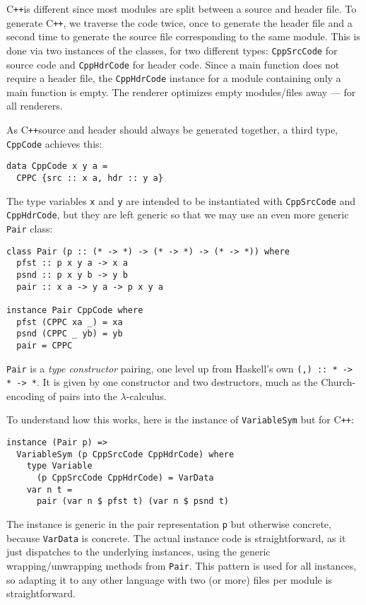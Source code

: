 \documentclass[sigplan,review,anonymous,prologue,dvipsnames]{acmart}
\newcommand{\Cplusplus}{C\texttt{++}}
\begin{document}
\Cplusplus is different since most modules are split between a source and
header file. To generate \Cplusplus, we traverse the code twice,
once to generate the header file and a second time to generate the
source file corresponding to the same module. This is done via two instances
of the classes, for two different types: \verb|CppSrcCode| for source code and
\verb|CppHdrCode| for header code. Since a main function does not require a
header file, the \verb|CppHdrCode| instance for a module containing only a main
function is empty. The renderer optimizes empty modules/files away --- for
all renderers.

As \Cplusplus source and header should always be generated together, a third
type, \verb|CppCode| achieves this:
\begin{lstlisting}
data CppCode x y a =
  CPPC {src :: x a, hdr :: y a}
\end{lstlisting}
The type variables \verb|x| and \verb|y| are intended to be instantiated with
\verb|CppSrcCode| and \verb|CppHdrCode|, but they are left generic
so that we may use an even more generic \verb|Pair| class:
\begin{lstlisting}
class Pair (p :: (* -> *) -> (* -> *) -> (* -> *)) where
  pfst :: p x y a -> x a
  psnd :: p x y b -> y b
  pair :: x a -> y a -> p x y a

instance Pair CppCode where
  pfst (CPPC xa _) = xa
  psnd (CPPC _ yb) = yb
  pair = CPPC
\end{lstlisting}
\verb|Pair| is a \emph{type constructor} pairing, one level up from
Haskell's own \verb|(,) :: * -> * -> *|.  It is given by one constructor
and two destructors, much as the Church-encoding of pairs into the
$\lambda$-calculus.

To understand how this works, here is the instance of \verb|VariableSym|
but for \Cplusplus:
\begin{lstlisting}
instance (Pair p) => 
  VariableSym (p CppSrcCode CppHdrCode) where
    type Variable 
      (p CppSrcCode CppHdrCode) = VarData
    var n t = 
      pair (var n $ pfst t) (var n $ psnd t)
\end{lstlisting}
The instance is generic in the pair representation \verb|p| but
otherwise concrete, because \verb|VarData| is concrete. The actual
instance code is straightforward, as it just dispatches to the 
underlying instances, using the generic wrapping/unwrapping
methods from \verb|Pair|.  This pattern is used for all instances,
so adapting it to any other language with two (or more) files per
module is straightforward.
\end{document}
